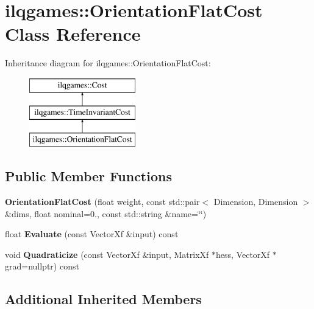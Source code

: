\hypertarget{classilqgames_1_1_orientation_flat_cost}{}\section{ilqgames\+:\+:Orientation\+Flat\+Cost Class Reference}
\label{classilqgames_1_1_orientation_flat_cost}
Inheritance diagram for ilqgames\+:\+:Orientation\+Flat\+Cost\+:\begin{figure}[H]
\begin{center}
\leavevmode
\includegraphics[height=3.000000cm]{classilqgames_1_1_orientation_flat_cost}
\end{center}
\end{figure}
\subsection*{Public Member Functions}
\begin{DoxyCompactItemize}
\item 
{\bfseries Orientation\+Flat\+Cost} (float weight, const std\+::pair$<$ Dimension, Dimension $>$ \&dims, float nominal=0., const std\+::string \&name=\char`\"{}\char`\"{})\hypertarget{classilqgames_1_1_orientation_flat_cost_a9f888bd3236e120cc973a3cbe8c0cb13}{}\label{classilqgames_1_1_orientation_flat_cost_a9f888bd3236e120cc973a3cbe8c0cb13}

\item 
float {\bfseries Evaluate} (const Vector\+Xf \&input) const \hypertarget{classilqgames_1_1_orientation_flat_cost_a9c6ba86849f65fe7d3e1f8ac38cce9eb}{}\label{classilqgames_1_1_orientation_flat_cost_a9c6ba86849f65fe7d3e1f8ac38cce9eb}

\item 
void {\bfseries Quadraticize} (const Vector\+Xf \&input, Matrix\+Xf $\ast$hess, Vector\+Xf $\ast$grad=nullptr) const \hypertarget{classilqgames_1_1_orientation_flat_cost_aeaa1b41bbaa9772c1c24cd643570ec85}{}\label{classilqgames_1_1_orientation_flat_cost_aeaa1b41bbaa9772c1c24cd643570ec85}

\end{DoxyCompactItemize}
\subsection*{Additional Inherited Members}



